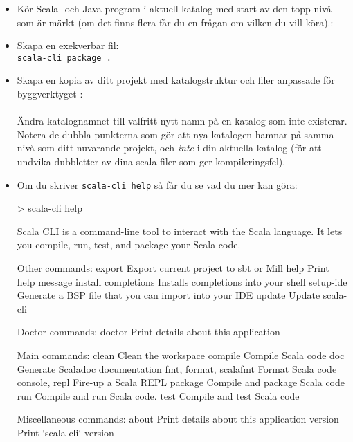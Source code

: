 \begin{itemize}
\item Kör Scala- och Java-program i aktuell katalog med start av den topp-nivå- som är märkt  (om det finns flera får du en frågan om vilken  du vill köra).:\\

\item Skapa en exekverbar fil:\\
\texttt{scala-cli package .}

\item Skapa en kopia av ditt projekt med katalogstruktur och filer anpassade för byggverktyget :\\
\\
Ändra katalognamnet  till valfritt nytt namn på en katalog som inte existerar. Notera de dubbla punkterna som gör att nya katalogen hamnar på samma nivå som ditt nuvarande projekt, och \emph{inte} i din aktuella katalog (för att undvika dubbletter av dina scala-filer som ger kompileringsfel).

\item Om du skriver \texttt{scala-cli help} så får du se vad du mer kan göra:

\begin{REPLsmall}
> scala-cli help

Scala CLI is a command-line tool to interact with the Scala language.
It lets you compile, run, test, and package your Scala code.

Other commands:
  export                 Export current project to sbt or Mill
  help                   Print help message
  install completions    Installs completions into your shell
  setup-ide              Generate a BSP file that you can import into your IDE
  update                 Update scala-cli

Doctor commands:
  doctor  Print details about this application

Main commands:
  clean                  Clean the workspace
  compile                Compile Scala code
  doc                    Generate Scaladoc documentation
  fmt, format, scalafmt  Format Scala code
  console, repl          Fire-up a Scala REPL
  package                Compile and package Scala code
  run                    Compile and run Scala code.
  test                   Compile and test Scala code

Miscellaneous commands:
  about    Print details about this application
  version  Print `scala-cli` version


\end{REPLsmall}
\end{itemize}
